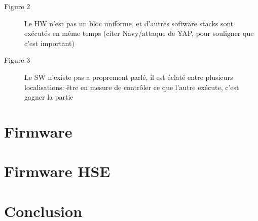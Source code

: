 
\begin{description}
\item [Figure 2] Le HW n’est pas un bloc uniforme, et d’autres software stacks
  sont exécutés en même temps (citer Navy/attaque de YAP, pour souligner que
  c’est important)
\item [Figure 3] Le SW n'existe pas a proprement parlé, il est éclaté entre
  plusieurs localisations; être en mesure de contrôler ce que l’autre exécute,
  c’est gagner la partie
\end{description}


\section{Firmware}
\label{sec:usecase:firmware}

\section{Firmware HSE}
\label{sec:usecase:hse}

\section{Conclusion}
\label{sec:usecase:conclusion}
